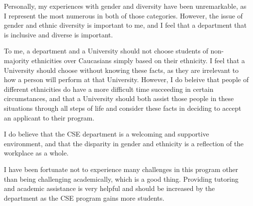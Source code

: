 \documentclass{article}
\begin{document}
Personally, my experiences with gender and diversity have been unremarkable, as I represent the most numerous in both of those categories.  However, the issue of gender and ethnic diversity is important to me, and I feel that a department that is inclusive and diverse is important.  

To me, a department and a University should not choose students of non-majority ethnicities over Caucasians simply based on their ethnicity.  I feel that a University should choose without knowing these facts, as they are irrelevant to how a person will perform at that University.  However, I do beleive that people of different ethnicities do have a more difficult time succeeding in certain circumstances, and that a University should both assist those people in these situations through all steps of life and consider these facts in deciding to accept an applicant to their program. 

I do believe that the CSE department is a welcoming and supportive environment, and that the disparity in gender and ethnicity is a reflection of the workplace as a whole. 

I have been fortunate not to experience many challenges in this program other than being challenging academically, which is a good thing.  Providing tutoring and academic assistance is very helpful and should be increased by the department as the CSE program gains more students.
\end{document}
